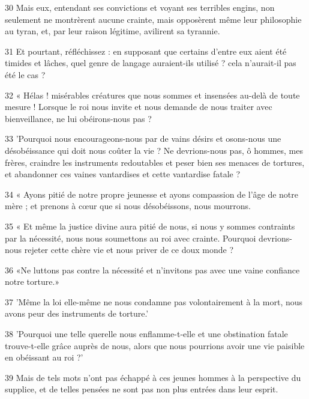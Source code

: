 \par 30 Mais eux, entendant ses convictions et voyant ses terribles engins, non seulement ne montrèrent aucune crainte, mais opposèrent même leur philosophie au tyran, et, par leur raison légitime, avilirent sa tyrannie.

\par 31 Et pourtant, réfléchissez : en supposant que certains d’entre eux aient été timides et lâches, quel genre de langage auraient-ils utilisé ? cela n'aurait-il pas été le cas ?

\par 32 « Hélas ! misérables créatures que nous sommes et insensées au-delà de toute mesure ! Lorsque le roi nous invite et nous demande de nous traiter avec bienveillance, ne lui obéirons-nous pas ?

\par 33 'Pourquoi nous encourageons-nous par de vains désirs et osons-nous une désobéissance qui doit nous coûter la vie ? Ne devrions-nous pas, ô hommes, mes frères, craindre les instruments redoutables et peser bien ses menaces de tortures, et abandonner ces vaines vantardises et cette vantardise fatale ?

\par 34 « Ayons pitié de notre propre jeunesse et ayons compassion de l'âge de notre mère ; et prenons à cœur que si nous désobéissons, nous mourrons.

\par 35 « Et même la justice divine aura pitié de nous, si nous y sommes contraints par la nécessité, nous nous soumettons au roi avec crainte. Pourquoi devrions-nous rejeter cette chère vie et nous priver de ce doux monde ?

\par 36 «Ne luttons pas contre la nécessité et n'invitons pas avec une vaine confiance notre torture.»

\par 37 'Même la loi elle-même ne nous condamne pas volontairement à la mort, nous avons peur des instruments de torture.'

\par 38 'Pourquoi une telle querelle nous enflamme-t-elle et une obstination fatale trouve-t-elle grâce auprès de nous, alors que nous pourrions avoir une vie paisible en obéissant au roi ?'

\par 39 Mais de tels mots n'ont pas échappé à ces jeunes hommes à la perspective du supplice, et de telles pensées ne sont pas non plus entrées dans leur esprit.

